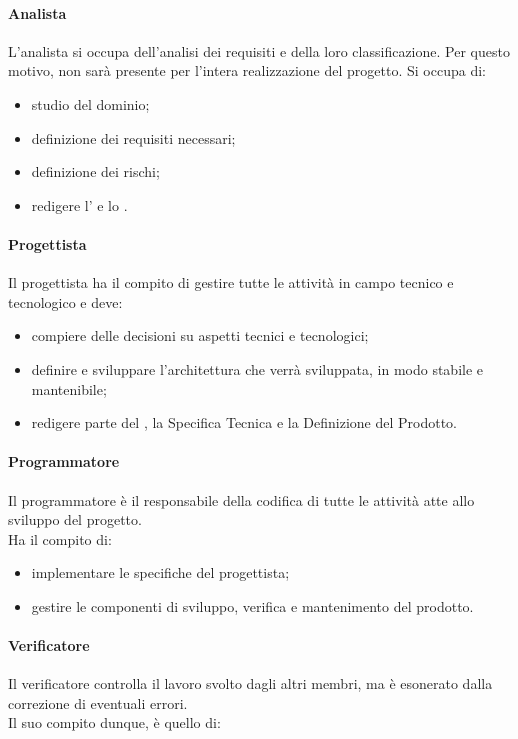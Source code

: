		\paragraph{Analista}
		L'analista si occupa dell'analisi dei requisiti e della loro classificazione. Per questo motivo, non sarà presente per l'intera realizzazione del progetto.
		Si occupa di:
		\begin{itemize}
			\item studio del dominio;
			\item definizione dei requisiti necessari;
			\item definizione dei rischi;
			\item redigere l' e lo .
		\end{itemize}

		\paragraph{Progettista}
		Il progettista ha il compito di gestire tutte le attività in campo tecnico e tecnologico e deve:
		\begin{itemize}
			\item compiere delle decisioni su aspetti tecnici e tecnologici;
			\item definire e sviluppare l'architettura che verrà sviluppata, in modo stabile e mantenibile;
			\item redigere parte del , la Specifica Tecnica e la Definizione del Prodotto.
		\end{itemize}

		\paragraph{Programmatore}
		Il programmatore è il responsabile della codifica di tutte le attività atte allo sviluppo del progetto. \\
		Ha il compito di:
		\begin{itemize}
			\item implementare le specifiche del progettista;
			\item gestire le componenti di sviluppo, verifica e mantenimento del prodotto.
		\end{itemize}

		\paragraph{Verificatore}
		Il verificatore controlla il lavoro svolto dagli altri membri, ma è esonerato dalla correzione di eventuali errori. \\
		Il suo compito dunque, è quello di:

